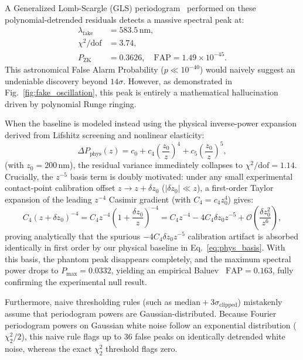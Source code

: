 A Generalized Lomb-Scargle (GLS) periodogram~\cite{zechmeister2009} performed on these polynomial-detrended residuals detects a massive spectral peak at:
\begin{align}
\lambda_{\mathrm{fake}} &= 583.5\,\mathrm{nm}, \\
\chi^2/\mathrm{dof} &= 3.74, \\
P_{\mathrm{ZK}} &= 0.3626, \quad \mathrm{FAP} = 1.49 \times 10^{-45}.
\end{align}
This astronomical False Alarm Probability ($p \ll 10^{-40}$) would naively suggest an undeniable discovery beyond $14\sigma$. However, as demonstrated in Fig.~\ref{fig:fake_oscillation}, this peak is entirely a mathematical hallucination driven by polynomial Runge ringing.

When the baseline is modeled instead using the physical inverse-power expansion derived from Lifshitz screening and nonlinear elasticity:
\begin{equation}
\Delta P_{\mathrm{phys}}(z) = c_0 + c_4 \left(\frac{z_0}{z}\right)^4 + c_5 \left(\frac{z_0}{z}\right)^5,
\label{eq:phys_basis}
\end{equation}
(with $z_0 = 200\,\mathrm{nm}$), the residual variance immediately collapses to $\chi^2/\mathrm{dof} = 1.14$. Crucially, the $z^{-5}$ basis term is doubly motivated: under any small experimental contact-point calibration offset $z \to z + \delta z_0$ ($|\delta z_0| \ll z$), a first-order Taylor expansion of the leading $z^{-4}$ Casimir gradient (with $C_4 = c_4 z_0^4$) gives:
\begin{equation}
C_4 (z + \delta z_0)^{-4} = C_4 z^{-4}\left(1 + \frac{\delta z_0}{z}\right)^{-4} = C_4 z^{-4} - 4 C_4 \delta z_0 z^{-5} + \mathcal{O}\!\left(\frac{\delta z_0^2}{z^6}\right),
\label{eq:taylor_drift}
\end{equation}
proving analytically that the spurious $-4 C_4 \delta z_0 z^{-5}$ calibration artifact is absorbed identically in first order by our physical baseline in Eq.~\eqref{eq:phys_basis}. With this basis, the phantom peak disappears completely, and the maximum spectral power drops to $P_{\max} = 0.0332$, yielding an empirical Baluev~\cite{baluev2008} $\mathrm{FAP} = 0.163$, fully confirming the experimental null result.

Furthermore, naive thresholding rules (such as $\mathrm{median} + 3\sigma_{\mathrm{clipped}}$) mistakenly assume that periodogram powers are Gaussian-distributed. Because Fourier periodogram powers on Gaussian white noise follow an exponential distribution ($\chi^2_2/2$), this naive rule flags up to 36 false peaks on identically detrended white noise, whereas the exact $\chi^2_2$ threshold flags zero.

